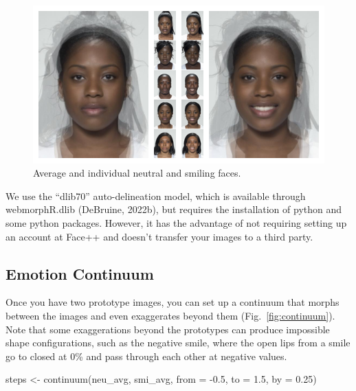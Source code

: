 \documentclass[
  doc,floatsintext]{apa6}
\newenvironment{Shaded}{\begin{snugshade}}{\end{snugshade}}
\newcommand{\AttributeTok}[1]{\textcolor[rgb]{0.77,0.63,0.00}{#1}}
\newcommand{\FloatTok}[1]{\textcolor[rgb]{0.00,0.00,0.81}{#1}}
\newcommand{\FunctionTok}[1]{\textcolor[rgb]{0.00,0.00,0.00}{#1}}
\newcommand{\NormalTok}[1]{#1}
\newcommand{\OtherTok}[1]{\textcolor[rgb]{0.56,0.35,0.01}{#1}}
\newcommand{\SpecialCharTok}[1]{\textcolor[rgb]{0.00,0.00,0.00}{#1}}
\begin{document}
\begin{figure}
\includegraphics[width=1\linewidth]{index_files/figure-latex/emo-avg-1} \caption{Average and individual neutral and smiling faces.}\label{fig:emo-avg}
\end{figure}

We use the ``dlib70'' auto-delineation model, which is available through webmorphR.dlib (DeBruine, 2022b), but requires the installation of python and some python packages. However, it has the advantage of not requiring setting up an account at Face++ and doesn't transfer your images to a third party.

\hypertarget{emotion-continuum}{%
\subsection{Emotion Continuum}\label{emotion-continuum}}

Once you have two prototype images, you can set up a continuum that morphs between the images and even exaggerates beyond them (Fig.~\ref{fig:continuum}). Note that some exaggerations beyond the prototypes can produce impossible shape configurations, such as the negative smile, where the open lips from a smile go to closed at 0\% and pass through each other at negative values.

\begin{Shaded}
\begin{Highlighting}[]
\NormalTok{steps }\OtherTok{\textless{}{-}} \FunctionTok{continuum}\NormalTok{(neu\_avg, smi\_avg, }\AttributeTok{from =} \SpecialCharTok{{-}}\FloatTok{0.5}\NormalTok{, }\AttributeTok{to =} \FloatTok{1.5}\NormalTok{, }\AttributeTok{by =} \FloatTok{0.25}\NormalTok{)}
\end{Highlighting}
\end{Shaded}
\end{document}
